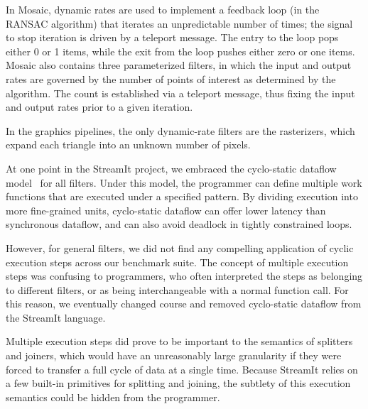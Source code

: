 In Mosaic, dynamic rates are used to implement a feedback loop (in the
RANSAC algorithm) that iterates an unpredictable number of times; the
signal to stop iteration is driven by a teleport message.  The entry
to the loop pops either 0 or 1 items, while the exit from the loop
pushes either zero or one items.  Mosaic also contains three
parameterized filters, in which the input and output rates are
governed by the number of points of interest as determined by the
algorithm.  The count is established via a teleport message, thus
fixing the input and output rates prior to a given iteration.

In the graphics pipelines, the only dynamic-rate filters are the
rasterizers, which expand each triangle into an unknown number of
pixels.

\myitem {\cyclostatic} At one point in the StreamIt project, we
embraced the cyclo-static dataflow
model~\cite{bilsen_cyclo-static_1995,parks_comparison_1995} for all
filters.  Under this model, the programmer can define multiple work
functions that are executed under a specified pattern.  By dividing
execution into more fine-grained units, cyclo-static dataflow can
offer lower latency than synchronous dataflow, and can also avoid
deadlock in tightly constrained loops.
\label{sec:cyclostatic}

However, for general filters, we did not find any compelling
application of cyclic execution steps across our benchmark suite.  The
concept of multiple execution steps was confusing to programmers, who
often interpreted the steps as belonging to different filters, or as
being interchangeable with a normal function call.  For this reason,
we eventually changed course and removed cyclo-static dataflow from the
StreamIt language.

Multiple execution steps did prove to be important to the semantics of
splitters and joiners, which would have an unreasonably large
granularity if they were forced to transfer a full cycle of data at a
single time.  Because StreamIt relies on a few built-in primitives for
splitting and joining, the subtlety of this execution semantics could
be hidden from the programmer.


